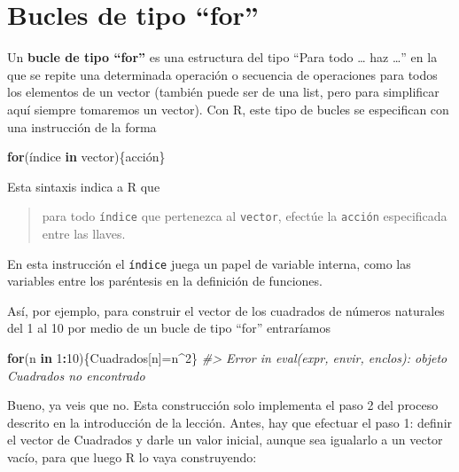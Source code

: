 \documentclass[
]{book}
\newenvironment{Shaded}{\begin{snugshade}}{\end{snugshade}}
\newcommand{\CommentTok}[1]{\textcolor[rgb]{0.56,0.35,0.01}{\textit{#1}}}
\newcommand{\ControlFlowTok}[1]{\textcolor[rgb]{0.13,0.29,0.53}{\textbf{#1}}}
\newcommand{\DecValTok}[1]{\textcolor[rgb]{0.00,0.00,0.81}{#1}}
\newcommand{\NormalTok}[1]{#1}
\newcommand{\OperatorTok}[1]{\textcolor[rgb]{0.81,0.36,0.00}{\textbf{#1}}}
\theoremstyle{definition}
\theoremstyle{definition}
\theoremstyle{definition}
\theoremstyle{remark}
\begin{document}
\hypertarget{bucles-de-tipo-for}{%
\section{Bucles de tipo ``for''}\label{bucles-de-tipo-for}}

Un \textbf{bucle de tipo ``for''} es una estructura del tipo ``Para todo \ldots{} haz \ldots{}'' en la que se repite una determinada operación o secuencia de operaciones para todos los elementos de un vector (también puede ser de una list, pero para simplificar aquí siempre tomaremos un vector). Con R, este tipo de bucles se especifican con una instrucción de la forma

\begin{Shaded}
\begin{Highlighting}[]
\ControlFlowTok{for}\NormalTok{(índice }\ControlFlowTok{in}\NormalTok{ vector)\{acción\}}
\end{Highlighting}
\end{Shaded}

Esta sintaxis indica a R que

\begin{quote}
para todo \texttt{índice} que pertenezca al \texttt{vector}, efectúe la \texttt{acción} especificada entre las llaves.
\end{quote}

En esta instrucción el \texttt{índice} juega un papel de variable interna, como las variables entre los paréntesis en la definición de funciones.

Así, por ejemplo, para construir el vector de los cuadrados de números naturales del 1 al 10 por medio de un bucle de tipo ``for'' entraríamos

\begin{Shaded}
\begin{Highlighting}[]
\ControlFlowTok{for}\NormalTok{(n }\ControlFlowTok{in} \DecValTok{1}\OperatorTok{:}\DecValTok{10}\NormalTok{)\{Cuadrados[n]=n}\OperatorTok{\^{}}\DecValTok{2}\NormalTok{\}}
\CommentTok{\#\textgreater{} Error in eval(expr, envir, enclos): objeto \textquotesingle{}Cuadrados\textquotesingle{} no encontrado}
\end{Highlighting}
\end{Shaded}

Bueno, ya veis que no. Esta construcción solo implementa el paso 2 del proceso descrito en la introducción de la lección. Antes, hay que efectuar el paso 1: definir el vector de Cuadrados y darle un valor inicial, aunque sea igualarlo a un vector vacío, para que luego R lo vaya construyendo:
\end{document}
